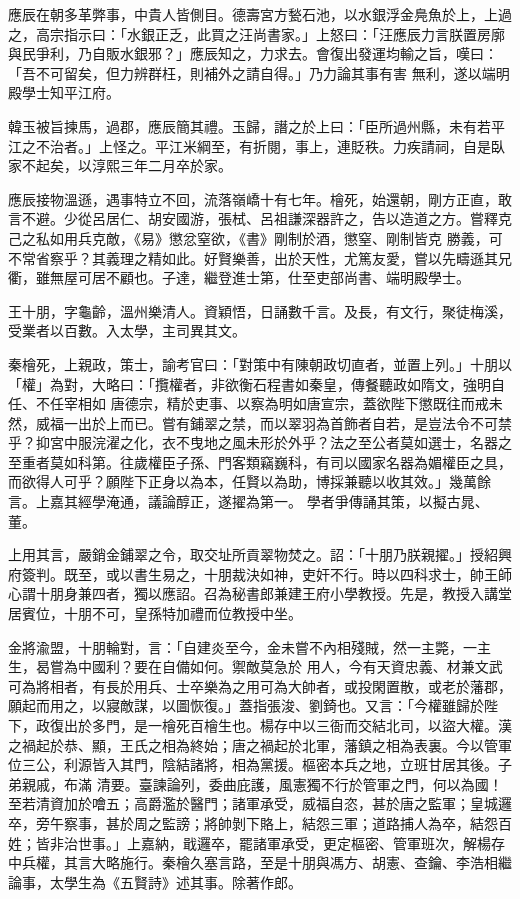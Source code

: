 \begin{pinyinscope}
 應辰在朝多革弊事，中貴人皆側目。德壽宮方甃石池，以水銀浮金鳧魚於上，上過之，高宗指示曰：「水銀正乏，此買之汪尚書家。」上怒曰：「汪應辰力言朕置房廓與民爭利，乃自販水銀邪？」應辰知之，力求去。會復出發運均輸之旨，嘆曰：「吾不可留矣，但力辨群枉，則補外之請自得。」乃力論其事有害
 無利，遂以端明殿學士知平江府。



 韓玉被旨揀馬，過郡，應辰簡其禮。玉歸，譖之於上曰：「臣所過州縣，未有若平江之不治者。」上怪之。平江米綱至，有折閱，事上，連貶秩。力疾請祠，自是臥家不起矣，以淳熙三年二月卒於家。



 應辰接物溫遜，遇事特立不回，流落嶺嶠十有七年。檜死，始還朝，剛方正直，敢言不避。少從呂居仁、胡安國游，張栻、呂祖謙深器許之，告以造道之方。嘗釋克己之私如用兵克敵，《易》懲忿窒欲，《書》剛制於酒，懲窒、剛制皆克
 勝義，可不常省察乎？其義理之精如此。好賢樂善，出於天性，尤篤友愛，嘗以先疇遜其兄衢，雖無屋可居不顧也。子達，繼登進士第，仕至吏部尚書、端明殿學士。



 王十朋，字龜齡，溫州樂清人。資穎悟，日誦數千言。及長，有文行，聚徒梅溪，受業者以百數。入太學，主司異其文。



 秦檜死，上親政，策士，諭考官曰：「對策中有陳朝政切直者，並置上列。」十朋以「權」為對，大略曰：「攬權者，非欲衡石程書如秦皇，傳餐聽政如隋文，強明自任、不任宰相如
 唐德宗，精於吏事、以察為明如唐宣宗，蓋欲陛下懲既往而戒未然，威福一出於上而已。嘗有鋪翠之禁，而以翠羽為首飾者自若，是豈法令不可禁乎？抑宮中服浣濯之化，衣不曳地之風未形於外乎？法之至公者莫如選士，名器之至重者莫如科第。往歲權臣子孫、門客類竊巍科，有司以國家名器為媚權臣之具，而欲得人可乎？願陛下正身以為本，任賢以為助，博採兼聽以收其效。」幾萬餘言。上嘉其經學淹通，議論醇正，遂擢為第一。
 學者爭傳誦其策，以擬古晁、董。



 上用其言，嚴銷金鋪翠之令，取交址所貢翠物焚之。詔：「十朋乃朕親擢。」授紹興府簽判。既至，或以書生易之，十朋裁決如神，吏奸不行。時以四科求士，帥王師心謂十朋身兼四者，獨以應詔。召為秘書郎兼建王府小學教授。先是，教授入講堂居賓位，十朋不可，皇孫特加禮而位教授中坐。



 金將渝盟，十朋輪對，言：「自建炎至今，金未嘗不內相殘賊，然一主斃，一主生，曷嘗為中國利？要在自備如何。禦敵莫急於
 用人，今有天資忠義、材兼文武可為將相者，有長於用兵、士卒樂為之用可為大帥者，或投閑置散，或老於藩郡，願起而用之，以寢敵謀，以圖恢復。」蓋指張浚、劉錡也。又言：「今權雖歸於陛下，政復出於多門，是一檜死百檜生也。楊存中以三衙而交結北司，以盜大權。漢之禍起於恭、顯，王氏之相為終始；唐之禍起於北軍，藩鎮之相為表裏。今以管軍位三公，利源皆入其門，陰結諸將，相為黨援。樞密本兵之地，立班甘居其後。子弟親戚，布滿
 清要。臺諫論列，委曲庇護，風憲獨不行於管軍之門，何以為國！至若清資加於噲五；高爵濫於醫門；諸軍承受，威福自恣，甚於唐之監軍；皇城邏卒，旁午察事，甚於周之監謗；將帥剝下賂上，結怨三軍；道路捕人為卒，結怨百姓；皆非治世事。」上嘉納，戢邏卒，罷諸軍承受，更定樞密、管軍班次，解楊存中兵權，其言大略施行。秦檜久塞言路，至是十朋與馮方、胡憲、查鑰、李浩相繼論事，太學生為《五賢詩》述其事。除著作郎。




\end{pinyinscope}

